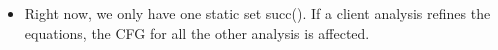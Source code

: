 \begin{itemize}
\item Right now, we only have one static set succ(). If a client analysis refines the equations, the CFG for all the other analysis is affected.

\end{itemize}